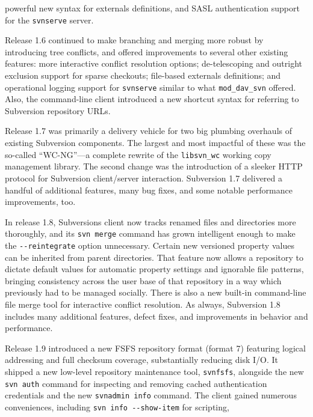 \begin{description}
powerful new syntax for externals definitions, and SASL authentication
support for the \texttt{svnserve} server.
\item[Subversion 1.6 (March 2009)]
Release 1.6 continued to make branching and merging more robust by
introducing tree conflicts, and offered improvements to several other
existing features: more interactive conflict resolution options;
de-telescoping and outright exclusion support for sparse checkouts;
file-based externals definitions; and operational logging support for
\texttt{svnserve} similar to what \texttt{mod\_dav\_svn} offered. Also,
the command-line client introduced a new shortcut syntax for referring
to Subversion repository URLs.
\item[Subversion 1.7 (October 2011)]
Release 1.7 was primarily a delivery vehicle for two big plumbing
overhauls of existing Subversion components. The largest and most
impactful of these was the so-called ``WC-NG''---a complete rewrite of
the \texttt{libsvn\_wc} working copy management library. The second
change was the introduction of a sleeker HTTP protocol for Subversion
client/server interaction. Subversion 1.7 delivered a handful of
additional features, many bug fixes, and some notable performance
improvements, too.
\item[Subversion 1.8 (June 2013)]
In release 1.8, Subversion\textquotesingle s client now tracks renamed
files and directories more thoroughly, and its \texttt{svn\ merge}
command has grown intelligent enough to make the
\texttt{-\/-reintegrate} option unnecessary. Certain new versioned
property values can be inherited from parent directories. That feature
now allows a repository to dictate default values for automatic property
settings and ignorable file patterns, bringing consistency across the
user base of that repository in a way which previously had to be managed
socially. There is also a new built-in command-line file merge tool for
interactive conflict resolution. As always, Subversion 1.8 includes many
additional features, defect fixes, and improvements in behavior and
performance.
\item[Subversion 1.9 (August 2015)]
Release 1.9 introduced a new FSFS repository format (format 7) featuring
logical addressing and full checksum coverage, substantially reducing
disk I/O. It shipped a new low-level repository maintenance tool,
\texttt{svnfsfs}, alongside the new \texttt{svn\ auth} command for
inspecting and removing cached authentication credentials and the new
\texttt{svnadmin\ info} command. The client gained numerous
conveniences, including \texttt{svn\ info\ -\/-show-item} for scripting,

\end{description}
